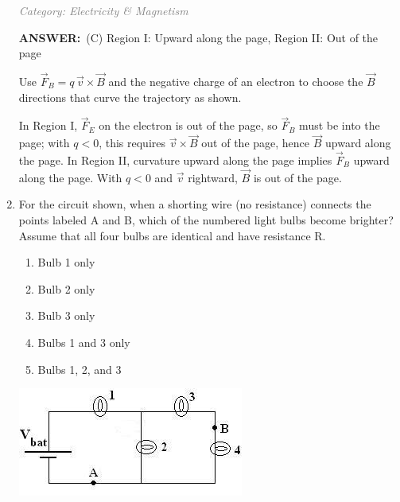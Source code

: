 ﻿\documentclass[12pt, a4paper]{article}
\makeatletter
\newcommand{\finalanswer}[1]{\textbf{ANSWER:}~#1}
\newif\if@categoryprinted
\newcommand{\category}[1]{\if@categoryprinted\relax\else\textit{\textcolor{gray}{Category: #1}}\global\@categoryprintedtrue\fi}
\makeatother
\begin{document}
\begin{CJK*}{UTF8}{gbsn}
\begin{enumerate}[itemsep=1.0em, topsep=0.6em]
\category{Electricity \& Magnetism}
\begin{answerbox}
\finalanswer{(C) Region I: Upward along the page, Region II: Out of the page}
\end{answerbox}
\begin{insightbox}
Use $\vec F_B=q\,\vec v\times\vec B$ and the negative charge of an electron to choose the $\vec B$ directions that curve the trajectory as shown.
\end{insightbox}
\begin{solutionbox}

In Region I, $\vec F_E$ on the electron is out of the page, so $\vec F_B$ must be into the page; with $q<0$, this requires $\vec v\times\vec B$ out of the page, hence $\vec B$ upward along the page. In Region II, curvature upward along the page implies $\vec F_B$ upward along the page. With $q<0$ and $\vec v$ rightward, $\vec B$ is out of the page.
\end{solutionbox}

\newpage

\item \label{prob:9}
\noindent\begin{minipage}[t]{0.6\linewidth}
\vspace{0pt}
For the circuit shown, when a shorting wire (no resistance) connects the points labeled A and B, which of the numbered light bulbs become brighter? Assume that all four bulbs are identical and have resistance R.
\begin{enumerate}[label=(\Alph*)]
    \item Bulb 1 only
    \item Bulb 2 only
    \item Bulb 3 only
    \item Bulbs 1 and 3 only
    \item Bulbs 1, 2, and 3
\end{enumerate}
\end{minipage}%
\hfill
\begin{minipage}[t]{0.33\linewidth}
\vspace{0pt}
\centering
\includegraphics[width=\linewidth]{Problem_09_Figure.png}
\end{minipage}


\end{enumerate}
\end{CJK*}
\end{document}
